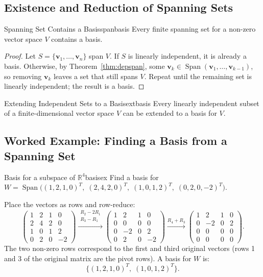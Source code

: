 \documentclass[12pt,a4paper]{article}
\newcommand{\R}{\mathbb{R}}
\newcommand{\vv}[1]{\mathbf{#1}}
\DeclareMathOperator{\Span}{Span}
\begin{document}
		\subsection{Existence and Reduction of Spanning Sets}
		
		\begin{theorem}{Spanning Set Contains a Basis}{spanbasis}
			Every finite spanning set for a non-zero vector space $V$ contains a basis.
		\end{theorem}
		
		\begin{proof}
			Let $S = \{\vv{v}_1, \ldots, \vv{v}_n\}$ span $V$.  If $S$ is linearly
			independent, it is already a basis.  Otherwise, by
			Theorem~\ref{thm:depspan}, some $\vv{v}_k \in \Span(\vv{v}_1,\ldots,
			\vv{v}_{k-1})$, so removing $\vv{v}_k$ leaves a set that still spans $V$.
			Repeat until the remaining set is linearly independent; the result is a basis.
		\end{proof}
		
		\begin{theorem}{Extending Independent Sets to a Basis}{extbasis}
			Every linearly independent subset of a finite-dimensional vector space $V$
			can be extended to a basis for $V$.
		\end{theorem}
		
		\subsection{Worked Example: Finding a Basis from a Spanning Set}
		
		\begin{example}{Basis for a subspace of $\R^4$}{basisex}
			Find a basis for
			$W = \Span\!\bigl((1,2,1,0)^T,\; (2,4,2,0)^T,\; (1,0,1,2)^T,\;
			(0,2,0,-2)^T\bigr)$.
			
			Place the vectors as rows and row-reduce:
			\[
			\begin{pmatrix}
				1&2&1&0\\ 2&4&2&0\\ 1&0&1&2\\ 0&2&0&-2
			\end{pmatrix}
			\xrightarrow{\substack{R_2-2R_1\\R_3-R_1}}
			\begin{pmatrix}
				1&2&1&0\\ 0&0&0&0\\ 0&-2&0&2\\ 0&2&0&-2
			\end{pmatrix}
			\xrightarrow{R_4+R_3}
			\begin{pmatrix}
				1&2&1&0\\ 0&-2&0&2\\ 0&0&0&0\\ 0&0&0&0
			\end{pmatrix}.
			\]
			The two non-zero rows correspond to the first and third original vectors
			(rows 1 and 3 of the original matrix are the pivot rows).  A basis for
			$W$ is:
			\[
			\bigl\{(1,2,1,0)^T,\; (1,0,1,2)^T\bigr\}.
			\]
		\end{example}
		
\end{document}
